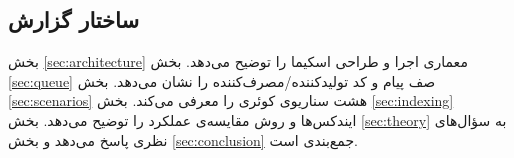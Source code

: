 \subsection{ساختار گزارش}

بخش \ref{sec:architecture} معماری اجرا و طراحی اسکیما را توضیح می‌دهد. بخش \ref{sec:queue} صف پیام و کد تولیدکننده/مصرف‌کننده را نشان می‌دهد. بخش \ref{sec:scenarios} هشت سناریوی کوئری را معرفی می‌کند. بخش \ref{sec:indexing} ایندکس‌ها و روش مقایسه‌ی عملکرد را توضیح می‌دهد. بخش \ref{sec:theory} به سؤال‌های نظری پاسخ می‌دهد و بخش \ref{sec:conclusion} جمع‌بندی است.
